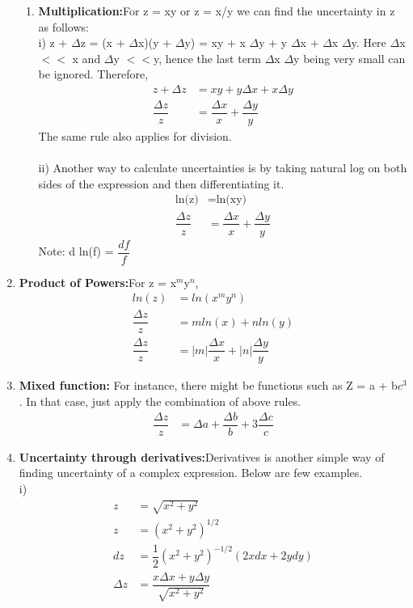 \begin{enumerate}
\begin{enumerate}
        \item \textbf{Multiplication:}For z = xy or z = x/y we can find the uncertainty in z as follows: \\
        i) z + $\Delta$z = (x + $\Delta$x)(y + $\Delta$y) = xy + x $\Delta$y + y $\Delta$x + $\Delta$x $\Delta$y. Here $\Delta$x $<<$ x and $\Delta$y $<<$y, hence the last term $\Delta$x $\Delta$y being very small can be ignored. Therefore, 
        \begin{align*}
            z + \Delta z &= xy + y\Delta x + x\Delta y \\
            \dfrac{\Delta z}{z} &= \dfrac{\Delta x}{x} + \dfrac{\Delta y}{y}
        \end{align*}
        The same rule also applies for division. \\\\
        ii) Another way to calculate uncertainties is by taking natural log on both sides of the expression and then differentiating it.
        \begin{align*}
        \text{ln(z)} &= \text{ln(xy)}\\
        \dfrac{\Delta z}{z} &= \dfrac{\Delta x}{x} + \dfrac{\Delta y}{y}
        \end{align*}
        Note: d ln(f) = $\dfrac{df}{f}$
    \end{enumerate}
    \item \textbf{Product of Powers:}For z = x$^m$y$^n$, 
    \begin{align*}
        ln(z) &= ln(x^m y^n)\\
        \dfrac{\Delta z}{z} &= m ln(x) + n ln(y)\\
        \dfrac{\Delta z}{z} &= |m|\dfrac{\Delta x}{x} + |n|\dfrac{\Delta y}{y}
    \end{align*}
    
    \item \textbf{Mixed function:} For instance, there might be functions such as Z = a + b$c^3$. In that case, just apply the combination of above rules.  
    \begin{align*}
        \dfrac{\Delta z}{z} &= \Delta a + \dfrac{\Delta b}{b} + 3\dfrac{\Delta c}{c}
    \end{align*}
    
    \item \textbf{Uncertainty through derivatives:}Derivatives is another simple way of finding uncertainty of a complex expression. Below are few examples. \\
    i)  \begin{align*}
         z &= \sqrt{x^2 + y^2}\\
         z &= (x^2 + y^2)^{1/2}\\
         dz &= \dfrac{1}{2}(x^2 + y^2)^{-1/2}(2xdx + 2ydy)\\
         \Delta z &= \dfrac{x\Delta x + y\Delta y}{\sqrt{x^2 + y^2}}
       \end{align*}
       

\end{enumerate}
